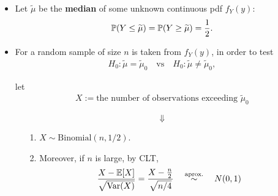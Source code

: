 \begin{frame}
	\begin{itemize}
		\item Let $\widetilde{\mu}$ be the {\bf median} of some unknown continuous pdf $f_Y(y)$:
			\begin{align*}
				\mathbb{P}(Y\le \widetilde{\mu} )	= \mathbb{P}(Y\ge \widetilde{\mu} )	=\frac{1}{2}.
		  \end{align*}
			\bigskip
		\item For a random sample of size $n$ is taken from  $f_Y(y)$, in order to test
		\begin{align*}
			H_0: \widetilde{\mu}=\widetilde{\mu}_0\quad\text{vs}\quad
			H_0: \widetilde{\mu}\ne\widetilde{\mu}_0,
		\end{align*}
		\item[] let
			\begin{align*}
			   X := \text{the number of observations exceeding $\widetilde{\mu}_0$}
			\end{align*}
		\item[]
			\[\Downarrow\]
			\begin{center}
				\begin{minipage}{0.6\textwidth}
					\begin{itemize}
							\item[1.]\normalsize $X\sim\text{Binomial}(n,1/2)$.
							\item[2.]\normalsize Moreover, if $n$ is large, by CLT,
							 \begin{align*}
								\frac{X-\mathbb{E}[X]}{\sqrt{\text{Var}(X)}} = \frac{X-\frac{n}{2}}{\sqrt{n/4}} \quad \stackrel{\text{aprox.}}{\sim} \quad N(0,1)
							\end{align*}
					\end{itemize}
				\end{minipage}
			\end{center}
	\end{itemize}
\end{frame}
